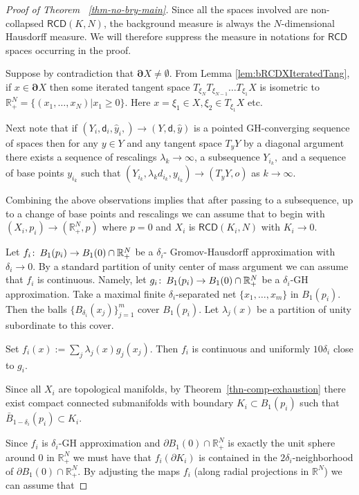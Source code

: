 \documentclass[a4paper]{amsart}
\newcounter{assu}
\theoremstyle{plain}
\theoremstyle{definition}
\numberwithin{equation}{section}
\newcommand{\R}{\mathbb{R}}
\newcommand{\RCD}{\mathsf{RCD}}
\newcommand{\sfd}{\mathsf d}
\def\co{\colon\thinspace}
\newcommand{\bRCD}{\boldsymbol\partial}
\begin{document}
{{\begin{proof}[Proof of Theorem ~\ref{thm-no-bry-main}]
Since all the spaces involved are non-collapsed $\RCD(K,N)$, the background measure is always the $N$-dimensional Hausdorff measure.  We will therefore suppress the measure in notations for $\RCD$ spaces occurring in the proof.




Suppose by contradiction that $\bRCD X\ne \emptyset$.  { From Lemma \ref{lem:bRCDXIteratedTang},} if $x\in\bRCD X$ then some iterated tangent space $T_{\xi_N}T_{\xi_{N-1}}\ldots T_{\xi_1} X$ is isometric to 
$\R^N_+=\{(x_1,\ldots,x_N)| x_1\ge 0\}$. Here $x=\xi_1\in X, \xi_2\in T_{\xi_1}X$ etc.

Next note that if $(Y_i, \sfd_i, \hat y_i,)\to (Y, \sfd, \hat y)$ is a pointed GH-converging sequence of  spaces then for any $y\in Y$ and any tangent space $T_yY$ by a diagonal argument there exists a sequence of rescalings $\lambda_k\to\infty$, a subsequence $Y_{i_k},$ and a sequence of base points $y_{i_k}$ such that $(Y_{i_k},\lambda_k d_{i_k},y_{i_k})\to (T_yY,o)$ as $k\to\infty$.

Combining the above observations implies that after passing to a subsequence, up to a change of base points and rescalings we can assume that
to begin with $(X_i,p_i)\to (\R^N_+,p)$ where $p=0$ and $X_i$ is $\RCD(K_i,N)$ with $K_i\to 0$.

Let $f_i\co B_1(p_i)\to B_1(0)\cap \R^N_+$ be a $\delta_i$- Gromov-Hausdorff approximation with $\delta_i\to 0$. By a standard partition of unity center of mass argument we can assume that $f_i$ is continuous.
Namely,  let $g_i\co B_1(p_i)\to B_1(0)\cap \R^N_+$ be a $\delta_i$-GH approximation. Take a maximal finite $\delta_i$-separated net $\{x_1,\ldots, x_m\}$ in  $B_1(p_i)$. Then the balls $\{B_{\delta_i}(x_j)\}_{j=1}^m$ cover $B_1(p_i)$. Let $\lambda_j(x)$ be a partition of unity subordinate to this cover.

Set $f_i(x):=\sum_j\lambda_j(x)g_j(x_j)$. Then $f_i$ is continuous and uniformly $10\delta_i$ close to $g_i$.


Since  all $X_i$ are topological manifolds, by   Theorem~\ref{thn-comp-exhaustion} there exist compact connected submanifolds with boundary $K_i\subset B_1(p_i)$ such that $\bar B_{1-\delta_i}(p_i)\subset K_i$.



Since $f_i$ is $\delta_i$-GH approximation and $\partial B_1(0)\cap \R^N_+$ is exactly the unit sphere around $0$ in $\R^N_+$  we must have that 
$f_i(\partial K_i)$ is contained in the $2\delta_i$-neighborhood of $\partial B_1(0)\cap \R^N_+$. By adjusting the maps $f_i$ (along radial projections in $\R^N$) we can assume that


\end{proof}}}
\end{document}
